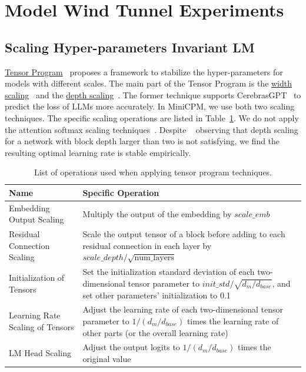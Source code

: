 \section{Model Wind Tunnel Experiments}
\label{MWTE}

\subsection{Scaling Hyper-parameters Invariant LM}
\uline{Tensor Program}~\citep{yang2022tensor, yang2023tensor} proposes a framework to stabilize the hyper-parameters for models with different scales. The main part of the Tensor Program is the \uline{width scaling}~\citep{yang2022tensor} and the \uline{depth scaling}~\citep{yang2023tensor}. The former technique supports CerebrasGPT~\citep{dey2023cerebras} to predict the loss of LLMs more accurately. In MiniCPM, we use both two scaling techniques. The specific scaling operations are listed in Table~\ref{tab:mup}. We do not apply the attention softmax scaling techniques~\citep{yang2022tensor}. Despite ~\cite{yang2023tensor} observing that depth scaling for a network with block depth larger than two is not satisfying, we find the resulting optimal learning rate is stable empirically.

\begin{table}[h]
\centering
\begin{tabular}{l|p{8cm}}
\toprule
\textbf{Name}                       & \textbf{Specific Operation}                                                                                                                 \\ \midrule
Embedding Output Scaling            & Multiply the output of the embedding by $scale\_{emb}$                                                                                                                                                     \\ \hline
Residual Connection Scaling         & Scale the output tensor of a block before adding to each residual connection in each layer by $scale\_{depth}/\sqrt{\text{num\_layers}}$ 
\\ \hline
Initialization of Tensors           & Set the initialization standard deviation of each two-dimensional tensor parameter to $init\_std/\sqrt{d_m/d_{base}}$, and set other parameters' initialization to 0.1                  \\ \hline
Learning Rate Scaling of Tensors    & Adjust the learning rate of each two-dimensional tensor parameter to $1/({d_m/d_{base}}) $ times the learning rate of other parts (or the overall learning rate)                    \\ \hline
LM Head Scaling                    & Adjust the output logits to $1/(d_m/d_{base})$ times the original value                                                                                                           \\ \bottomrule
\end{tabular}
\caption{List of operations used when applying tensor program techniques.}
\label{tab:mup}
\end{table}

